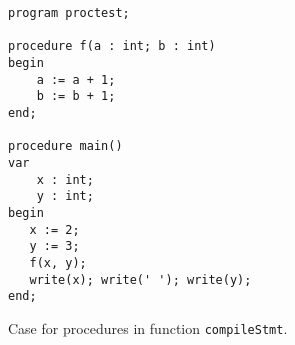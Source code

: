 \begin{figure}[H]
  \begin{lstlisting}[style=paladim]
program proctest;

procedure f(a : int; b : int)
begin
    a := a + 1;
    b := b + 1;
end;

procedure main()
var
    x : int;
    y : int;
begin
   x := 2;
   y := 3;
   f(x, y);
   write(x); write(' '); write(y);
end;
  \end{lstlisting}
  \caption{Case for procedures in function \texttt{compileStmt}.}
  \label{fig_compileF}
\end{figure}
